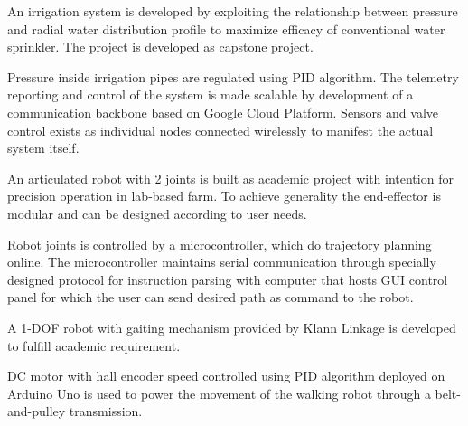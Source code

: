 \documentclass[letterpaper]{deedy-resume} %
\begin{document}
\begin{minipage}[t]{0.66\textwidth}
\vspace{\topsep}
\begin{tightitemize}
\item An irrigation system is developed by exploiting the relationship between pressure and radial water distribution profile to maximize efficacy of conventional water sprinkler. 
The project is developed as capstone project.
\item Pressure inside irrigation pipes are regulated using PID algorithm. 
The telemetry reporting and control of the system is made scalable by development of a communication backbone based on Google Cloud Platform.
Sensors and valve control exists as individual nodes connected wirelessly to manifest the actual system itself.
\end{tightitemize} 
\sectionspace %

\vspace{\topsep}
\begin{tightitemize}
\item An articulated robot with 2 joints is built as academic project with intention for precision operation in lab-based farm. To achieve generality the end-effector is modular and can be designed according to user needs.
\item Robot joints is controlled by a microcontroller, which do trajectory planning online. 
The microcontroller maintains serial communication through specially designed protocol for instruction parsing with computer that hosts GUI control panel for which the user can send desired path as command to the robot.
\end{tightitemize} 
\sectionspace %

\vspace{\topsep}
\begin{tightitemize}
\item A 1-DOF robot with gaiting mechanism provided by Klann Linkage is developed to fulfill academic requirement.
\item DC motor with hall encoder speed controlled using PID algorithm deployed on Arduino Uno is used to power the movement of the walking robot through a belt-and-pulley transmission.
\end{tightitemize} 
\sectionspace %


\end{minipage}
\end{document}
